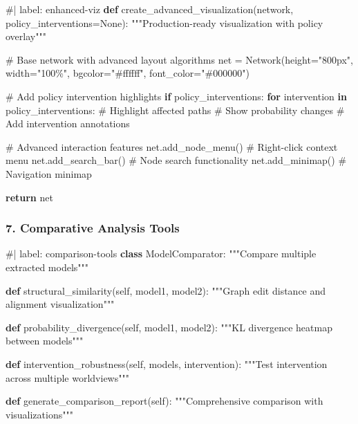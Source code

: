 \documentclass[
  11pt,
  letterpaper,
]{book}
\newenvironment{Shaded}{\begin{snugshade}}{\end{snugshade}}
\newcommand{\CommentTok}[1]{\textcolor[rgb]{0.37,0.37,0.37}{#1}}
\newcommand{\ControlFlowTok}[1]{\textcolor[rgb]{0.00,0.23,0.31}{\textbf{#1}}}
\newcommand{\KeywordTok}[1]{\textcolor[rgb]{0.00,0.23,0.31}{\textbf{#1}}}
\newcommand{\NormalTok}[1]{\textcolor[rgb]{0.00,0.23,0.31}{#1}}
\newcommand{\OperatorTok}[1]{\textcolor[rgb]{0.37,0.37,0.37}{#1}}
\newcommand{\StringTok}[1]{\textcolor[rgb]{0.13,0.47,0.30}{#1}}
\newcommand{\VariableTok}[1]{\textcolor[rgb]{0.07,0.07,0.07}{#1}}
\begin{document}
\begin{Shaded}
\begin{Highlighting}[]
\CommentTok{\#| label: enhanced{-}viz}
\KeywordTok{def}\NormalTok{ create\_advanced\_visualization(network, policy\_interventions}\OperatorTok{=}\VariableTok{None}\NormalTok{):}
    \CommentTok{"""Production{-}ready visualization with policy overlay"""}
    
    \CommentTok{\# Base network with advanced layout algorithms}
\NormalTok{    net }\OperatorTok{=}\NormalTok{ Network(height}\OperatorTok{=}\StringTok{"800px"}\NormalTok{, width}\OperatorTok{=}\StringTok{"100\%"}\NormalTok{, }
\NormalTok{                  bgcolor}\OperatorTok{=}\StringTok{"\#ffffff"}\NormalTok{, font\_color}\OperatorTok{=}\StringTok{"\#000000"}\NormalTok{)}
    
    \CommentTok{\# Add policy intervention highlights}
    \ControlFlowTok{if}\NormalTok{ policy\_interventions:}
        \ControlFlowTok{for}\NormalTok{ intervention }\KeywordTok{in}\NormalTok{ policy\_interventions:}
            \CommentTok{\# Highlight affected paths}
            \CommentTok{\# Show probability changes}
            \CommentTok{\# Add intervention annotations}
    
    \CommentTok{\# Advanced interaction features}
\NormalTok{    net.add\_node\_menu()  }\CommentTok{\# Right{-}click context menu}
\NormalTok{    net.add\_search\_bar()  }\CommentTok{\# Node search functionality}
\NormalTok{    net.add\_minimap()     }\CommentTok{\# Navigation minimap}
    
    \ControlFlowTok{return}\NormalTok{ net}
\end{Highlighting}
\end{Shaded}

\subsubsection{7. Comparative Analysis
Tools}\label{comparative-analysis-tools}

\begin{Shaded}
\begin{Highlighting}[]
\CommentTok{\#| label: comparison{-}tools}
\KeywordTok{class}\NormalTok{ ModelComparator:}
    \CommentTok{"""Compare multiple extracted models"""}
    
    \KeywordTok{def}\NormalTok{ structural\_similarity(}\VariableTok{self}\NormalTok{, model1, model2):}
        \CommentTok{"""Graph edit distance and alignment visualization"""}
        
    \KeywordTok{def}\NormalTok{ probability\_divergence(}\VariableTok{self}\NormalTok{, model1, model2):}
        \CommentTok{"""KL divergence heatmap between models"""}
        
    \KeywordTok{def}\NormalTok{ intervention\_robustness(}\VariableTok{self}\NormalTok{, models, intervention):}
        \CommentTok{"""Test intervention across multiple worldviews"""}
        
    \KeywordTok{def}\NormalTok{ generate\_comparison\_report(}\VariableTok{self}\NormalTok{):}
        \CommentTok{"""Comprehensive comparison with visualizations"""}
\end{Highlighting}
\end{Shaded}
\end{document}
